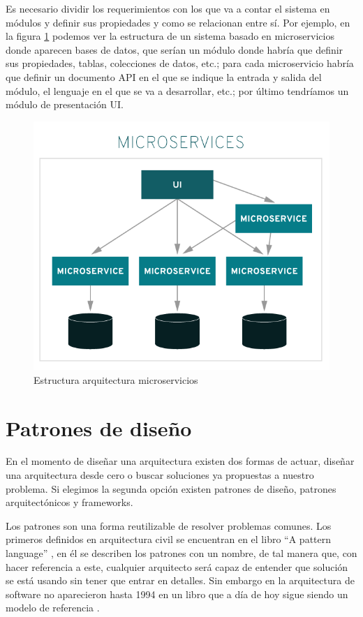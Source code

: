 \documentclass[12pt]{report} %
\begin{document}
	Es necesario dividir los requerimientos con los que va a contar el sistema en módulos y definir sus propiedades y como se relacionan entre sí. Por ejemplo, en la figura \ref{fig:microservices} podemos ver la estructura de un sistema basado en microservicios donde aparecen bases de datos, que serían un módulo donde habría que definir sus propiedades, tablas, colecciones de datos, etc.; para cada microservicio habría que definir un documento API en el que se indique la entrada y salida del módulo, el lenguaje en el que se va a desarrollar, etc.; por último tendríamos un módulo de presentación UI.
	\begin{figure}
		\centering
		\includegraphics[width=0.7\linewidth]{imagenes/monolithic-vs-microservices}
		\caption{Estructura arquitectura microservicios}
		\label{fig:microservices}
	\end{figure}

	\section{Patrones de diseño}
	 En el momento de diseñar una arquitectura existen dos formas de actuar, diseñar una arquitectura desde cero o buscar soluciones ya propuestas a nuestro problema. Si elegimos la segunda opción existen patrones de diseño, patrones arquitectónicos y frameworks.
	 
	 Los patrones son una forma reutilizable de resolver problemas comunes. Los primeros definidos en arquitectura civil se encuentran en el libro “A pattern language” \cite{PatternLanguage}, en él se describen los patrones con un nombre, de tal manera que, con hacer referencia a este, cualquier arquitecto será capaz de entender que solución se está usando sin tener que entrar en detalles. Sin embargo en la arquitectura de software no aparecieron hasta 1994 en un libro que a día de hoy sigue siendo un modelo de referencia \cite{gamma2002patrones}.
	 
\end{document}
